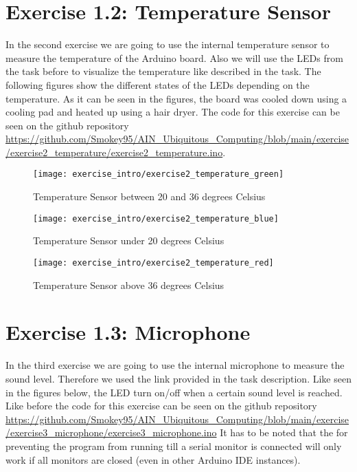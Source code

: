\section{Exercise 1.2: Temperature Sensor}

In the second exercise we are going to use the internal temperature sensor to measure the temperature of the Arduino board.
Also we will use the LEDs from the task before to visualize the temperature like described in the task.
\newline
\newline
The following figures show the different states of the LEDs depending on the temperature.
As it can be seen in the figures, the board was cooled down using a cooling pad and heated up using a hair dryer.
\newline
The code for this exercise can be seen on the github repository \url{https://github.com/Smokey95/AIN_Ubiquitous_Computing/blob/main/exercise/exercise2_temperature/exercise2_temperature.ino}.


\begin{figure}[h!]
    \centering
    \texttt{[image: exercise\_intro/exercise2\_temperature\_green]}
    \caption{Temperature Sensor between 20 and 36 degrees Celsius}
    \label{fig:temperature_sensor_green}
\end{figure}

\begin{figure}[h!]
  \centering
  \texttt{[image: exercise\_intro/exercise2\_temperature\_blue]}
  \caption{Temperature Sensor under 20 degrees Celsius}
  \label{fig:temperature_sensor_blue}
\end{figure}

\begin{figure}[h!]
  \centering
  \texttt{[image: exercise\_intro/exercise2\_temperature\_red]}
  \caption{Temperature Sensor above 36 degrees Celsius}
  \label{fig:temperature_sensor_red}
\end{figure}

\newpage

\section{Exercise 1.3: Microphone}

In the third exercise we are going to use the internal microphone to measure the sound level.
Therefore we used the link provided in the task description.
Like seen in the figures below, the LED turn on/off when a certain sound level is reached.
\newline
\newline
Like before the code for this exercise can be seen on the github repository \url{https://github.com/Smokey95/AIN_Ubiquitous_Computing/blob/main/exercise/exercise3_microphone/exercise3_microphone.ino}
It has to be noted that the  for preventing the program from running till a serial monitor is connected will only work 
if all monitors are closed (even in other Arduino IDE instances).

